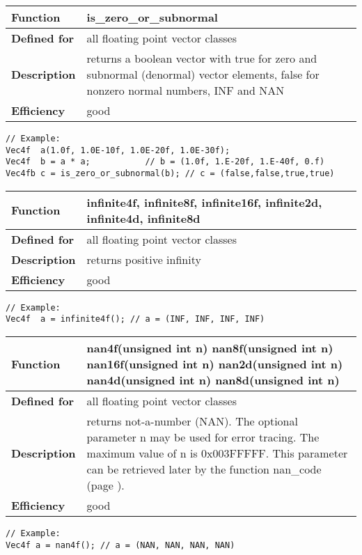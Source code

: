 \documentclass[vcl_manual.tex]{subfiles}
\begin{document}
\begin{tabular}{|p{25mm}|p{100mm}|}
\hline
\bfseries Function & is\_zero\_or\_subnormal \\ \hline
\bfseries Defined for & all floating point vector classes \\ \hline
\bfseries Description & returns a boolean vector with true for zero and subnormal (denormal) vector elements, false for nonzero normal numbers, INF and NAN \\ \hline
\bfseries Efficiency & good \\ \hline
\end{tabular}
\begin{lstlisting}[frame=none]
// Example:
Vec4f  a(1.0f, 1.0E-10f, 1.0E-20f, 1.0E-30f);
Vec4f  b = a * a;           // b = (1.0f, 1.E-20f, 1.E-40f, 0.f)
Vec4fb c = is_zero_or_subnormal(b); // c = (false,false,true,true)
\end{lstlisting}


\begin{tabular}{|p{25mm}|p{100mm}|}
\hline
\bfseries Function & infinite4f, infinite8f, infinite16f, \newline
infinite2d, infinite4d, infinite8d \\ \hline
\bfseries Defined for & all floating point vector classes \\ \hline
\bfseries Description & returns positive infinity \\ \hline
\bfseries Efficiency & good \\ \hline
\end{tabular}
\begin{lstlisting}[frame=none]
// Example:
Vec4f  a = infinite4f(); // a = (INF, INF, INF, INF)
\end{lstlisting}


\label{nan4f}
\begin{tabular}{|p{25mm}|p{100mm}|}
\hline
\bfseries Function & nan4f(unsigned int n) \newline
nan8f(unsigned int n) \newline
nan16f(unsigned int n) \newline
nan2d(unsigned int n) \newline
nan4d(unsigned int n) \newline
nan8d(unsigned int n) \\ \hline
\bfseries Defined for & all floating point vector classes \\ \hline
\bfseries Description & returns not-a-number (NAN). \newline
The optional parameter n may be used for error tracing. \newline
The maximum value of n is 0x003FFFFF.
This parameter can be retrieved later by the function nan\_code (page \pageref{nanCode}). \\ \hline
\bfseries Efficiency & good \\ \hline
\end{tabular}
\begin{lstlisting}[frame=none]
// Example:
Vec4f a = nan4f(); // a = (NAN, NAN, NAN, NAN)
\end{lstlisting}
\end{document}
